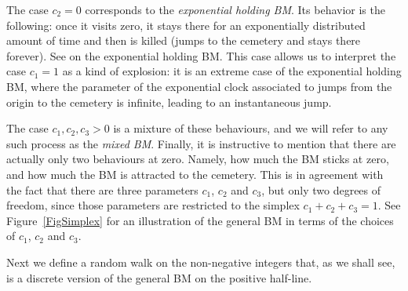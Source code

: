 \documentclass[12pt,a4paper]{article}
\theoremstyle{plain}
\theoremstyle{remark}
\begin{document}
	The case $c_2 = 0$ corresponds to the  \textit{exponential holding BM}. Its behavior is the following: once it visits zero, it  stays there for an exponentially distributed amount of time and then is killed (jumps to the cemetery and stays there forever). See \cite{Knight}  on the exponential holding BM. This case allows us to interpret the case $c_1=1$ as a kind of explosion: it is an extreme case of the exponential holding BM, where the parameter of the exponential clock associated to jumps from the origin to the cemetery is  infinite, leading to an instantaneous jump.
	
	The case $c_1,c_2,c_3>0$ is a mixture of these behaviours, and we will refer to any such process as the \textit{mixed BM}.  Finally, it is instructive to mention that there are actually only two behaviours at zero. Namely, how much the BM sticks at zero, and how much the BM is attracted to the cemetery. This is in agreement with the fact that there are three parameters $c_1$, $c_2$ and $c_3$, but only two degrees of freedom, since those parameters  are restricted to the simplex $c_1+c_2+c_3=1$. See Figure~\ref{FigSimplex} for an illustration of the general BM in terms of the choices of $c_1$, $c_2$ and $c_3$.
	
	
	Next  we define a random walk on the non-negative integers that, as we shall see, is a discrete version of the general BM on the positive half-line.
	
\end{document}
